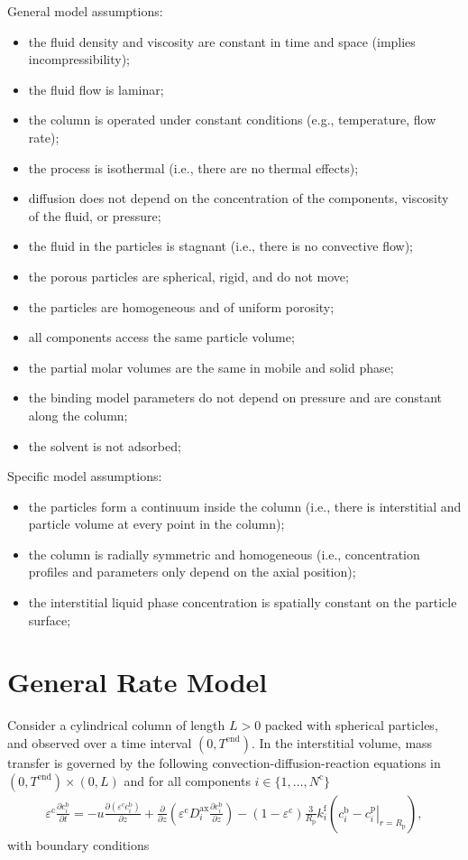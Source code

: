 \documentclass{article}
\begin{document}
General model assumptions:
\begin{itemize}
\item the fluid density and viscosity are constant in time and space (implies incompressibility);
\item the fluid flow is laminar;
\item the column is operated under constant conditions (e.g., temperature, flow rate);
\item the process is isothermal (i.e., there are no thermal effects);
\item diffusion does not depend on the concentration of the components, viscosity of the fluid, or pressure;
\item the fluid in the particles is stagnant (i.e., there is no convective flow);
\item the porous particles are spherical, rigid, and do not move;
\item the particles are homogeneous and of uniform porosity;
\item all components access the same particle volume;
\item the partial molar volumes are the same in mobile and solid phase;
\item the binding model parameters do not depend on pressure and are constant along the column;
\item the solvent is not adsorbed;
\end{itemize}


Specific model assumptions:
\begin{itemize}
\item the particles form a continuum inside the column (i.e., there is interstitial and particle volume at every point in the column);
\item the column is radially symmetric and homogeneous (i.e., concentration profiles and parameters only depend on the axial position);
\item the interstitial liquid phase concentration is spatially constant on the particle surface;
\end{itemize}


\section*{General Rate Model}
Consider a cylindrical column of length $L > 0$ packed with spherical particles, and observed over a time interval $(0, T^{\mathrm{end}})$.
In the interstitial volume, mass transfer is governed by the following convection-diffusion-reaction equations in $(0, T^\mathrm{end})\times (0, L)$ and for all components $i\in\{1, \dots, N^{\mathrm{c}} \}$
\begin{align}
\varepsilon^{\mathrm{c}} \frac{\partial c^{\mathrm{b}}_i}{\partial t} = - u \frac{\partial \left( \varepsilon^{\mathrm{c}} c^{\mathrm{b}}_i \right)}{\partial z} + \frac{\partial}{\partial z} \left( \varepsilon^{\mathrm{c}} D^{\mathrm{ax}}_{i} \frac{\partial c^{\mathrm{b}}_i}{\partial z} \right)- \left(1 - \varepsilon^{\mathrm{c}} \right) \frac{3}{R_{\mathrm{p}}} k^{\mathrm{f}}_{i} \left(c^{\mathrm{b}}_i - \left. c^{\mathrm{p}}_{i} \right|_{r = R_{\mathrm{p}}} \right),
\end{align}
with boundary conditions
\end{document}

